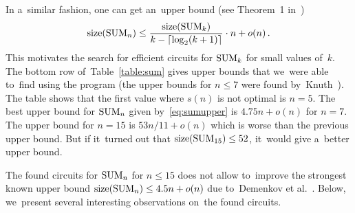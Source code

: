 In a~similar fashion, one can get an~upper bound (see Theorem~1 in~\cite{DBLP:conf/date/Kulikov18})
\begin{equation}\label{eq:sumupper}
\operatorname{size}(\operatorname{SUM}_n) \le \frac{\operatorname{size}(\operatorname{SUM}_k)}{k-\lceil \log_2(k+1) \rceil} \cdot n + o(n) \, .
\end{equation}
This motivates the search for efficient circuits
for $\operatorname{SUM}_k$ for small values of~$k$. The bottom row
of~Table~\ref{table:sum} gives upper bounds that
we~were able to~find using the program
(the upper bounds for $n \le 7$ were found
by~Knuth~\cite{Knuth:2008:ACP:1377542}).
The table shows that the first value where $s(n)$ is not
optimal is $n=5$. The best upper bound for $\operatorname{SUM}_n$ given
by~\eqref{eq:sumupper} is $4.75n+o(n)$ for $n=7$. The upper
bound for $n=15$ is $53n/11+o(n)$ which is worse than the
previous upper bound. But if it~turned out that
$\operatorname{size}(\operatorname{SUM}_{15}) \le 52$,
it~would give a~better upper bound.

The found circuits for $\operatorname{SUM}_n$ for $n \le 15$
does not allow to~improve the strongest known upper bound
$\operatorname{size}(\operatorname{SUM}_n) \le 4.5n+o(n)$ due to~Demenkov et al.~\cite{DBLP:journals/ipl/DemenkovKKY10}. Below,
we~present several interesting observations on~the found circuits.

